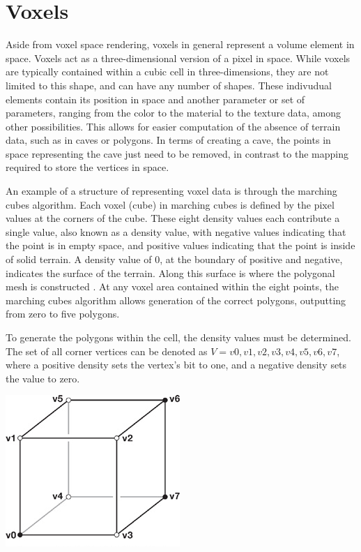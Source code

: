 \documentclass[10pt]{report}
\begin{document}
		\section{Voxels}
		
		Aside from voxel space rendering, voxels in general represent a volume element in space. Voxels act as a three-dimensional version of a pixel in space. While voxels are typically contained within a cubic cell in three-dimensions, they are not limited to this shape, and can have any number of shapes. These indivudual elements contain its position in space and another parameter or set of parameters, ranging from the color to the material to the texture data, among other possibilities. This allows for easier computation of the absence of terrain data, such as in caves or polygons. In terms of creating a cave, the points in space representing the cave just need to be removed, in contrast to the mapping required to store the vertices in space. 
		
		\label{pt:marching_cubes}
		An example of a structure of representing voxel data is through the marching cubes algorithm. Each voxel (cube) in marching cubes is defined by the pixel values at the corners of the cube. These eight density values each contribute a single value, also known as a density value, with negative values indicating that the point is in empty space, and positive values indicating that the point is inside of solid terrain. A density value of 0, at the boundary of positive and negative, indicates the surface of the terrain. Along this surface is where the polygonal mesh is constructed \cite{marching-cubes}. At any voxel area contained within the eight points, the marching cubes algorithm allows generation of the correct polygons, outputting from zero to five polygons.
		
		To generate the polygons within the cell, the density values must be determined. The set of all corner vertices can be denoted as \(V = {v0,v1,v2,v3,v4,v5,v6,v7}\), where a positive density sets the vertex's bit to one, and a negative density sets the value to zero. 
		
		\begin{minipage}{\textwidth}
			\centering
			\includegraphics[scale=0.75]{01fig03}
			\label{fig:marching-cube}
		\end{minipage}
		
\end{document}
